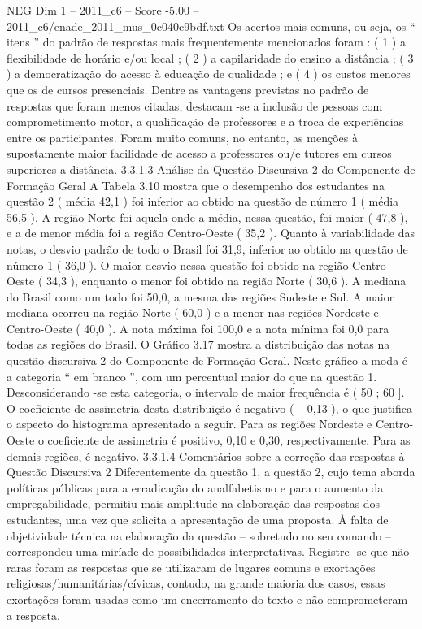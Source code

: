 \begin{textsample}{NEG Dim 1 – 2011\_c6 – Score -5.00 – 2011\_c6/enade\_2011\_mus\_0c040c9bdf.txt}
Os acertos mais comuns, ou seja, os “ itens ” do padrão de respostas mais frequentemente mencionados foram : ( 1 ) a flexibilidade de horário e/ou local ; ( 2 ) a capilaridade do ensino a distância ; ( 3 ) a democratização do acesso à educação de qualidade ; e ( 4 ) os custos menores que os de cursos presenciais.
Dentre as vantagens previstas no padrão de respostas que foram menos citadas, destacam -se a inclusão de pessoas com comprometimento motor, a qualificação de professores e a troca de experiências entre os participantes.
Foram muito comuns, no entanto, as menções à supostamente maior facilidade de acesso a professores ou/e tutores em cursos superiores a distância. 3.3.1.3 Análise da Questão Discursiva 2 do Componente de Formação Geral A Tabela 3.10 mostra que o desempenho dos estudantes na questão 2 ( média 42,1 ) foi inferior ao obtido na questão de número 1 ( média 56,5 ).
A região Norte foi aquela onde a média, nessa questão, foi maior ( 47,8 ), e a de menor média foi a região Centro-Oeste ( 35,2 ).
Quanto à variabilidade das notas, o desvio padrão de todo o Brasil foi 31,9, inferior ao obtido na questão de número 1 ( 36,0 ).
O maior desvio nessa questão foi obtido na região Centro-Oeste ( 34,3 ), enquanto o menor foi obtido na região Norte ( 30,6 ).
A mediana do Brasil como um todo foi 50,0, a mesma das regiões Sudeste e Sul.
A maior mediana ocorreu na região Norte ( 60,0 ) e a menor nas regiões Nordeste e Centro-Oeste ( 40,0 ).
A nota máxima foi 100,0 e a nota mínima foi 0,0 para todas as regiões do Brasil.
O Gráfico 3.17 mostra a distribuição das notas na questão discursiva 2 do Componente de Formação Geral.
Neste gráfico a moda é a categoria “ em branco ”, com um percentual maior do que na questão 1.
Desconsiderando -se esta categoria, o intervalo de maior frequência é ( 50 ; 60 ].
O coeficiente de assimetria desta distribuição é negativo ( – 0,13 ), o que justifica o aspecto do histograma apresentado a seguir.
Para as regiões Nordeste e Centro-Oeste o coeficiente de assimetria é positivo, 0,10 e 0,30, respectivamente.
Para as demais regiões, é negativo. 3.3.1.4 Comentários sobre a correção das respostas à Questão Discursiva 2 Diferentemente da questão 1, a questão 2, cujo tema aborda políticas públicas para a erradicação do analfabetismo e para o aumento da empregabilidade, permitiu mais amplitude na elaboração das respostas dos estudantes, uma vez que solicita a apresentação de uma proposta.
À falta de objetividade técnica na elaboração da questão – sobretudo no seu comando – correspondeu uma miríade de possibilidades interpretativas.
Registre -se que não raras foram as respostas que se utilizaram de lugares comuns e exortações religiosas/humanitárias/cívicas, contudo, na grande maioria dos casos, essas exortações foram usadas como um encerramento do texto e não comprometeram a resposta.

\end{textsample}

